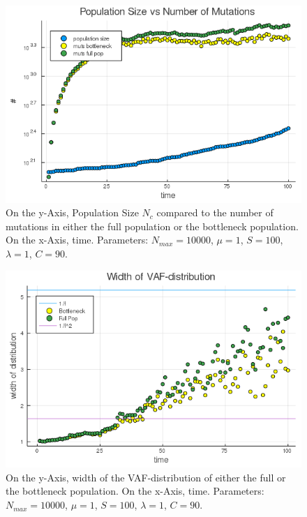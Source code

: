 \documentclass{article}
\numberwithin{equation}{subsection}
\begin{document}
	\begin{figure}[h!]
		\centering
		\includegraphics[width=\linewidth]{Figures/LogGrowth/document/stable_soma/LogVarTimesMutLive_N10000_mu1_t100_d32_C90}
		
		\caption{On the y-Axis, Population Size $N_c$ compared to the number of mutations in either the full population or the bottleneck population. On the x-Axis, time. Parameters: $ N_{max} = 10000$, $\mu = 1 $, $ S = 100 $, $ \lambda = 1$, $ C = 90 $.}
		\label{fig::NMutstimeC}
	\end{figure}
	
	\begin{figure}[h!]
		\centering
		\includegraphics[width=\linewidth]{Figures/LogGrowth/document/stable_soma/LogVarTimesAlt_N10000_mu1_t100_d32_C90}
		
		\caption{On the y-Axis, width of the VAF-distribution of either the full or the bottleneck population. On the x-Axis, time. Parameters: $ N_{max} = 10000$, $\mu = 1 $, $ S = 100 $, $ \lambda = 1$, $ C = 90 $.}
		\label{fig::WidthC}
	\end{figure}
	
\end{document}
